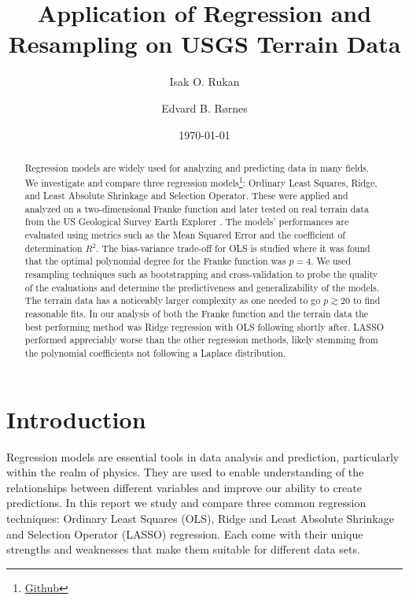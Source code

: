 \documentclass[%
reprint,
amsmath,amssymb,
aps,
pra,
]{revtex4-2}
\begin{document}
	
\title{Application of Regression and Resampling on USGS Terrain Data}
\author{Isak O. Rukan}
\author{Edvard B. Rørnes}
\date{\today}

\begin{abstract}
	Regression models are widely used for analyzing and predicting data in many fields. We investigate and compare three regression models\footnote{\href{https://github.com/EdvardRornes/FYS-STK4155/tree/main/Project1}{Github}}: Ordinary Least Squares, Ridge, and Least Absolute Shrinkage and Selection Operator. These were applied and analyzed on a two-dimensional Franke function and later tested on real terrain data from the US Geological Survey Earth Explorer \cite{USGS_EarthExplorer}. The models' performances are evaluated using metrics such as the Mean Squared Error and the coefficient of determination $R^2$. The bias-variance trade-off for OLS is studied where it was found that the optimal polynomial degree for the Franke function was $p=4$. We used resampling techniques such as bootstrapping and cross-validation to probe the quality of the evaluations and determine the predictiveness and generalizability of the models. The terrain data has a noticeably larger complexity as one needed to go $p\gtrsim 20$ to find reasonable fits. In our analysis of both the Franke function and the terrain data the best performing method was Ridge regression with OLS following shortly after. LASSO performed appreciably worse than the other regression methods, likely stemming from the polynomial coefficients not following a Laplace distribution.
\end{abstract}

\maketitle

\section{Introduction}
Regression models are essential tools in data analysis and prediction, particularly within the realm of physics. They are used to enable understanding of the relationships between different variables and improve our ability to create predictions. In this report we study and compare three common regression techniques: Ordinary Least Squares (OLS), Ridge and Least Absolute Shrinkage and Selection Operator (LASSO) regression. Each come with their unique strengths and weaknesses that make them suitable for different data sets. 
\end{document}
